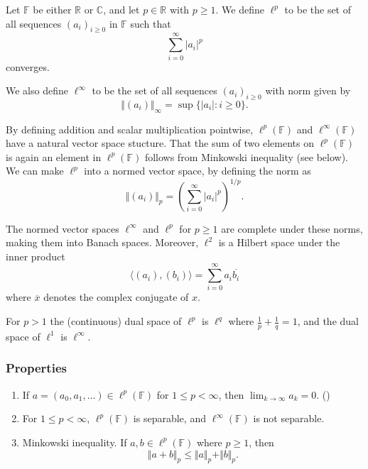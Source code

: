 \documentclass{article}
\begin{document}
Let $\mathbb{F}$ be either $\mathbb{R}$ or $\mathbb{C}$, and let $p\in\mathbb{R}$ with $p\geq 1$.  We define $\ell^p$ to be the set of all sequences $(a_i)_{i\geq 0}$ in $\mathbb{F}$ such that $$\sum_{i=0}^{\infty}|a_i|^p$$ converges. 

We also define $\ell^{\infty}$ to be the set of all  sequences $(a_i)_{i\geq 0}$ with norm given by $$\Vert (a_i)\Vert_{\infty} = \operatorname{sup}\{ |a_i|:i\geq 0\}.$$

By defining addition and scalar multiplication pointwise, $\ell^p(\mathbb{F})$ and
$\ell^\infty(\mathbb{F})$ have a natural vector space stucture.
That the sum of two elements on $\ell^p(\mathbb{F})$ is again an element
in $\ell^p(\mathbb{F})$ follows from Minkowski inequality
(see below).
We can make $\ell^p$ into a normed vector space, by defining the norm as $$\Vert (a_i)\Vert_p = (\sum_{i=0}^{\infty}|a_i|^p)^{1/p}.$$

The normed vector spaces $\ell^{\infty}$ and $\ell^p$ for $p\geq 1$ are complete under these norms, making them into Banach spaces.  Moreover, $\ell^2$ is a Hilbert space under the inner product $$\langle (a_i),(b_i)\rangle = \sum_{i=0}^{\infty}a_i \overline{b_i}$$ where $\overline{x}$ denotes the complex conjugate of $x$.

For $p>1$ the (continuous) dual space of $\ell^p$ is $\ell^q$ where $\frac{1}{p} + \frac{1}{q}=1$, and the dual space of $\ell^1$ is $\ell^{\infty}$.

\subsubsection*{Properties}
\begin{enumerate}
\item If $a=(a_0,a_1, \ldots ) \in \ell^p(\mathbb{F})$ for $1\le p< \infty$, then
$\lim_{k\to \infty} a_k =0$.
()
\item For $1\le p<\infty$, $\ell^p(\mathbb{F})$ is separable, and $\ell^\infty(\mathbb{F})$
is not separable.
\item Minkowski inequality. If $a,b\in \ell^p(\mathbb{F})$ where $p\ge 1$, then
$$
\Vert a+b \Vert_p \le \Vert a\Vert_p + \Vert b \Vert_p.
$$
\end{enumerate}
\end{document}

